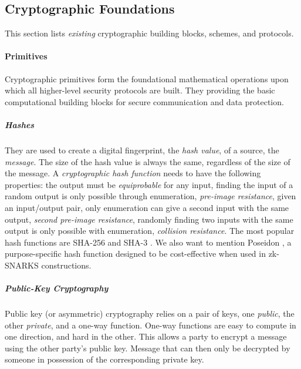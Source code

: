 \subsection{Cryptographic Foundations}
\label{subsub:cryptography}

This section lists \emph{existing} cryptographic building blocks, schemes, and protocols.


\paragraph{Primitives} Cryptographic primitives form the foundational mathematical operations upon which all higher-level security protocols are built.
They providing the basic computational building blocks for secure communication and data protection.

\subparagraph{Hashes} They are used to create a digital fingerprint, the \emph{hash value}, of a source, the \emph{message}.
The size of the hash value is always the same, regardless of the size of the message.
A \emph{cryptographic hash function} needs to have the following properties:
the output must be \emph{equiprobable} for any input, finding the input of a random output is only possible through enumeration, \emph{pre-image resistance}, given an input/output pair, only enumeration can give a second input with the same output, \emph{second pre-image resistance}, randomly finding two inputs with the same output is only possible with enumeration, \emph{collision resistance}.
The most popular hash functions are SHA-256 \cite{FIPS180-4} and SHA-3 \cite{FIPS202}.
We also want to mention Poseidon \cite{GKRRS21}, a purpose-specific hash function designed to be cost-effective when used in zk-SNARKS constructions.

\subparagraph{Public-Key Cryptography} 
\label{sp:public-key-cryptography}
Public key (or asymmetric) cryptography relies on a pair of keys, one \emph{public}, the other \emph{private}, and a one-way function. 
One-way functions are easy to compute in one direction, and hard in the other. 
This allows a party to encrypt a message using the other party's public key. 
Message that can then only be decrypted by someone in possession of the corresponding private key.

